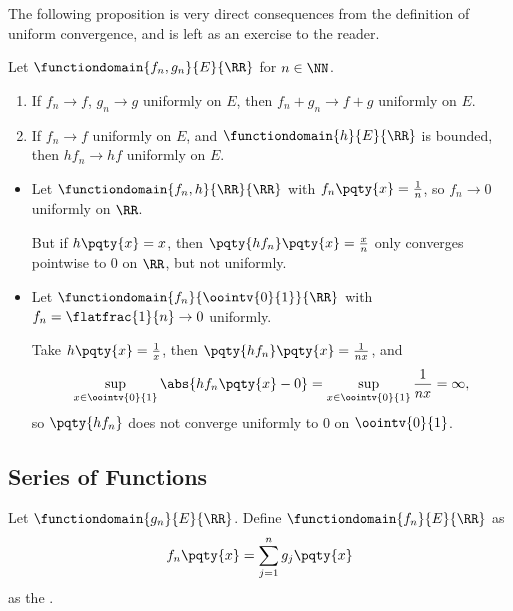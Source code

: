 The following proposition is very direct consequences from the definition of uniform convergence, and is left as an exercise to the reader.

\begin{proposition}
    Let \(\functiondomain{f_n, g_n}{E}{\RR}\) for \(n \in \NN\).
    \begin{enumerate}[label=(\roman*)]
        \item If \(f_n \to f\), \(g_n \to g\) uniformly on \(E\), then \(f_n + g_n \to f + g\) uniformly on \(E\).
        \item If \(f_n \to f\) uniformly on \(E\), and \(\functiondomain{h}{E}{\RR}\) is bounded, then \(h f_n \to h f\) uniformly on \(E\).
    \end{enumerate}
\end{proposition}

\begin{examples}
    \begin{itemize}
        \item Let \(\functiondomain{f_n, h}{\RR}{\RR}\) with \(f_n \pqty{x} = \frac{1}{n}\), so \(f_n \to 0\)uniformly on \(\RR\).

        But if \(h\pqty{x} = x\), then \(\pqty{h f_n} \pqty{x} = \frac{x}{n}\) only converges pointwise to \(0\) on \(\RR\), but not uniformly.

        \item Let \(\functiondomain{f_n}{\oointv{0}{1}}{\RR}\) with \(f_n = \flatfrac{1}{n} \to 0\) uniformly.
        
        Take \(h\pqty{x} = \frac{1}{x}\), then \(\pqty{h f_n} \pqty{x} = \frac{1}{nx}\), and \[
            \sup_{x \in \oointv{0}{1}} \abs{h f_n\pqty{x} - 0} = \sup_{x \in \oointv{0}{1}} \frac{1}{nx} = \infty,
        \]
        so \(\pqty{h f_n}\) does not converge uniformly to \(0\) on \(\oointv{0}{1}\).
    \end{itemize}
\end{examples}

\subsection{Series of Functions}

\begin{definition}
    Let \(\functiondomain{g_n}{E}{\RR}\). Define \(\functiondomain{f_n}{E}{\RR}\) as
    \[
        f_n \pqty{x} = \sum_{j = 1}^{n} g_j \pqty{x}
    \]
    as the .
\end{definition}

